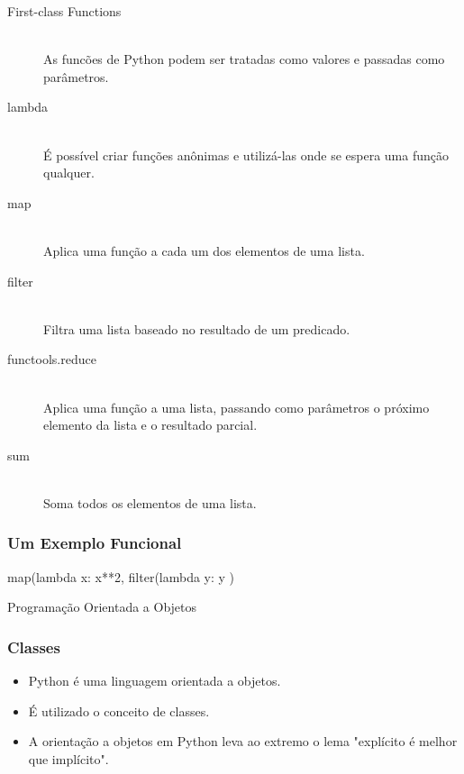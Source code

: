 \documentclass[aspectratio=169,14pt]{beamer}
\begin{document}
\begin{frame}
    \footnotesize
    \begin{description}
        \item[First-class Functions] \hfill \\ As funcões de Python podem ser
        tratadas como valores e passadas como parâmetros.
        \item[lambda] \hfill \\  É possível criar funções anônimas e utilizá-las
        onde se espera uma função qualquer.
        \item[map]  \hfill \\ Aplica uma função a cada um dos elementos de uma lista.
        \item[filter]  \hfill \\ Filtra uma lista baseado no resultado de um predicado.
        \item[functools.reduce]  \hfill \\ Aplica uma função a uma lista, passando como
        parâmetros o próximo elemento da lista e o resultado parcial.
        \item[sum]  \hfill \\ Soma todos os elementos de uma lista.
    \end{description}
\end{frame}

\begin{frame}[fragile]
    \frametitle{Um Exemplo Funcional}
    \begin{python}
        map(lambda x: x**2,
            filter(lambda y: y %
        )
    \end{python}
\end{frame}


\begin{frame}
    \begin{center}
        \Huge Programação Orientada a Objetos
    \end{center}
\end{frame}
\begin{frame}
    \frametitle{Classes}
    \begin{itemize}[label={}]
        \setlength\itemsep{1.5em}
        \item Python é uma linguagem orientada a objetos.
        \item É utilizado o conceito de classes.
        \item A orientação a objetos em Python leva ao extremo o
        lema "explícito é melhor que implícito".
    \end{itemize}
\end{frame}
\end{document}
